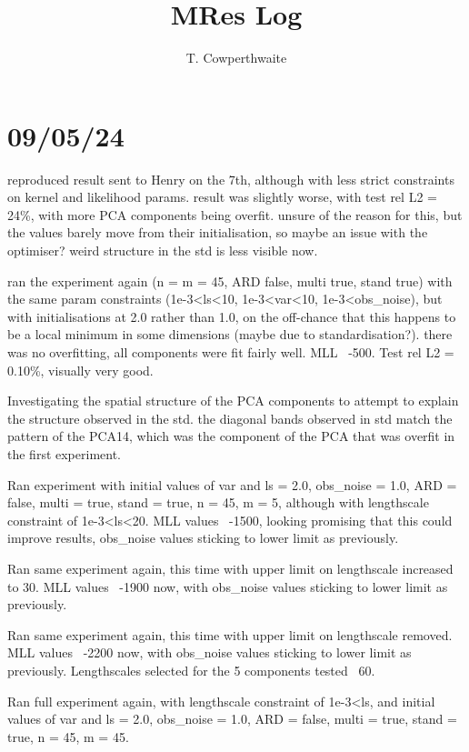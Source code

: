 \documentclass[11pt,a4paper]{article}
\begin{document}
\title{MRes Log}
\author{T. Cowperthwaite}

\maketitle

\section{09/05/24}

reproduced result sent to Henry on the 7th, although with less strict constraints on kernel and likelihood params. 
result was slightly worse, with test rel L2 = 24\%, with more PCA components being overfit.
unsure of the reason for this, but the values barely move from their initialisation, so maybe an issue with the optimiser?
weird structure in the std is less visible now.

ran the experiment again (n = m = 45, ARD false, multi true, stand true) with the same param constraints (1e-3<ls<10, 1e-3<var<10, 1e-3<obs_noise), but with initialisations at 2.0 rather than 1.0, on the off-chance that this happens to be a local minimum in some dimensions (maybe due to standardisation?).
there was no overfitting, all components were fit fairly well. 
MLL ~-500.
Test rel L2 = 0.10\%, visually very good.

Investigating the spatial structure of the PCA components to attempt to explain the structure observed in the std.
the diagonal bands observed in std match the pattern of the PCA14, which was the component of the PCA that was overfit in the first experiment.

Ran experiment with initial values of var and ls = 2.0, obs_noise = 1.0, ARD = false, multi = true, stand = true, n = 45, m = 5, although with lengthscale constraint of 1e-3<ls<20.
MLL values ~-1500, looking promising that this could improve results, obs_noise values sticking to lower limit as previously.

Ran same experiment again, this time with upper limit on lengthscale increased to 30.
MLL values ~-1900 now, with obs_noise values sticking to lower limit as previously.

Ran same experiment again, this time with upper limit on lengthscale removed.
MLL values ~-2200 now, with obs_noise values sticking to lower limit as previously.
Lengthscales selected for the 5 components tested ~60.

Ran full experiment again, with lengthscale constraint of 1e-3<ls, and initial values of var and ls = 2.0, obs_noise = 1.0, ARD = false, multi = true, stand = true, n = 45, m = 45.
\end{document}

